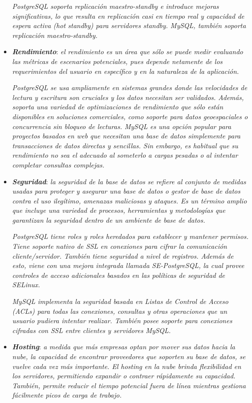 \documentclass[11pt,oneside]{book}
\begin{document}
\begin{itemize}
\textit{PostgreSQL soporta replicación maestro-standby e introduce mejoras significativas, lo que resulta en replicación casi en tiempo real y capacidad de espera activa (hot standby) para servidores standby. MySQL, también soporta replicación maestro-standby.}

\item \textit{\textbf{Rendimiento}}: \textit{el rendimiento es un área que sólo se puede medir evaluando las métricas de escenarios potenciales, pues depende netamente de los requerimientos del usuario en específico y en la naturaleza de la aplicación.}

\textit{PostgreSQL se usa ampliamente en sistemas grandes donde las velocidades de lectura y escritura son cruciales y los datos necesitan ser validados. Además, soporta una variedad de optimizaciones de rendimiento que sólo están disponibles en soluciones comerciales, como soporte para datos geoespaciales o concurrencia sin bloqueo de lecturas. MySQL es una opción popular para proyectos basados en web que necesitan una base de datos simplemente para transacciones de datos directas y sencillas. Sin embargo, es habitual que su rendimiento no sea el adecuado al someterlo a cargas pesadas o al intentar completar consultas complejas.}

\item \textit{\textbf{Seguridad}}: \textit{la seguridad de la base de datos se refiere al conjunto de medidas usadas para proteger y asegurar una base de datos o gestor de base de datos contra el uso ilegítimo, amenazas maliciosas y ataques. Es un término amplio que incluye una variedad de procesos, herramientas y metodologías que garantizan la seguridad dentro de un ambiente de base de datos.}

\textit{PostgreSQL tiene roles y roles heredados para establecer y mantener permisos. Tiene soporte nativo de SSL en conexiones para cifrar la comunicación cliente/servidor. También tiene seguridad a nivel de registros. Además de esto, viene con una mejora integrada llamada SE-PostgreSQL, la cual provee controles de acceso adicionales basados en las políticas de seguridad de SELinux.}

\textit{MySQL implementa la seguridad basada en Listas de Control de Acceso (ACLs) para todas las conexiones, consultas y otras operaciones que un usuario pudiera intentar realizar. También posee soporte para conexiones cifradas con SSL entre clientes y servidores MySQL.}

\newpage
\item \textit{\textbf{Hosting}}: \textit{a medida que más empresas optan por mover sus datos hacia la nube, la capacidad de encontrar proveedores que soporten su base de datos, se vuelve cada vez más importante. El hosting en la nube brinda flexibilidad en los servidores, permitiendo expandir o contraer rápidamente su capacidad. También, permite reducir el tiempo potencial fuera de línea mientras gestiona fácilmente picos de carga de trabajo.}


\end{itemize}
\end{document}
